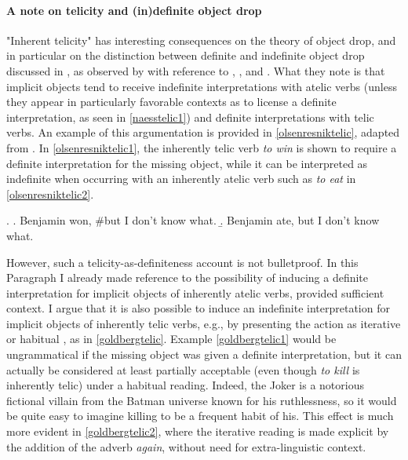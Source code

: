 \paragraph{A note on telicity and (in)definite object drop} "Inherent telicity" has interesting consequences on the theory of object drop, and in particular on the distinction between definite and indefinite object drop discussed in , as observed by \textcite[3-4]{OlsenResnik1997} with reference to \textcite{Allerton1975}, \textcite{Mittwoch1982}, and \textcite{Olsen1997}. What they note is that implicit objects tend to receive indefinite interpretations with atelic verbs (unless they appear in particularly favorable contexts as to license a definite interpretation, as seen in \ref{naesstelic1}) and definite interpretations with telic verbs. An example of this argumentation is provided in \ref{olsenresniktelic}, adapted from \textcite[3]{OlsenResnik1997}. In \ref{olsenresniktelic1}, the inherently telic verb \textit{to win} is shown to require a definite interpretation for the missing object, while it can be interpreted as indefinite when occurring with an inherently atelic verb such as \textit{to eat} in \ref{olsenresniktelic2}.

\ex. \label{olsenresniktelic} \a. \label{olsenresniktelic1} Benjamin won, \#but I don't know what. 
\b. \label{olsenresniktelic2} Benjamin ate, but I don't know what. 

However, such a telicity-as-definiteness account is not bulletproof. In this Paragraph I already made reference to the possibility of inducing a definite interpretation for implicit objects of inherently atelic verbs, provided sufficient context. I argue that it is also possible to induce an indefinite interpretation for implicit objects of inherently telic verbs, e.g., by presenting the action as iterative or habitual \parencite[507-509]{Goldberg2001}, as in \ref{goldbergtelic}. Example \ref{goldbergtelic1} would be ungrammatical if the missing object was given a definite interpretation, but it can actually be considered at least partially acceptable (even though \textit{to kill} is inherently telic) under a habitual reading. Indeed, the Joker is a notorious fictional villain from the Batman universe known for his ruthlessness, so it would be quite easy to imagine killing to be a frequent habit of his. This effect is much more evident in \ref{goldbergtelic2}, where the iterative reading is made explicit by the addition of the adverb \textit{again}, without need for extra-linguistic context.

